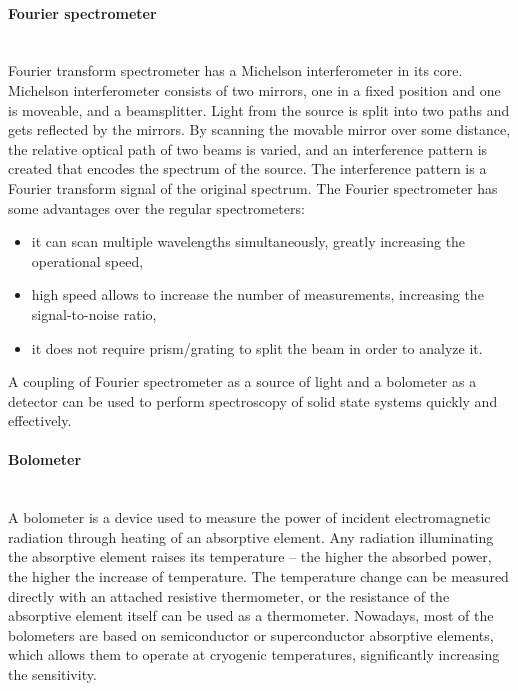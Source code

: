 \documentclass[titlepage,a4paper]{book}
\newcommand{\wciecie}{\quad\phantom{v}}
\newcommand{\myparagraph}[1]{\paragraph{#1}\mbox{}\\}
\begin{document}
\myparagraph{Fourier spectrometer}
\wciecie
Fourier transform spectrometer has a Michelson interferometer in its core. Michelson interferometer consists of two mirrors, one in a fixed position and one is moveable, and a beamsplitter. Light from the source is split into two paths and gets reflected by the mirrors. By scanning the movable mirror over some distance, the relative optical path of two beams is varied, and an interference pattern is created that encodes the spectrum of the source. The interference pattern is a Fourier transform signal of the original spectrum. The Fourier spectrometer has some advantages over the regular spectrometers:
\begin{itemize}
\item it can scan multiple wavelengths simultaneously, greatly increasing the operational speed, 
\item high speed allows to increase the number of measurements, increasing the signal-to-noise ratio,
\item it does not require prism/grating to split the beam in order to analyze it.
\end{itemize}

A coupling of Fourier spectrometer as a source of light and a bolometer as a detector can be used to perform spectroscopy of solid state systems quickly and effectively.

\myparagraph{Bolometer}
\wciecie
A bolometer is a device used to measure the power of incident electromagnetic radiation through heating of an absorptive element. Any radiation illuminating the absorptive element raises its temperature -- the higher the absorbed power, the higher the increase of temperature. The temperature change can be measured directly with an attached resistive thermometer, or the resistance of the absorptive element itself can be used as a thermometer. Nowadays, most of the bolometers are based on semiconductor or superconductor absorptive elements, which allows them to operate at cryogenic temperatures, significantly increasing the sensitivity.
\end{document}
